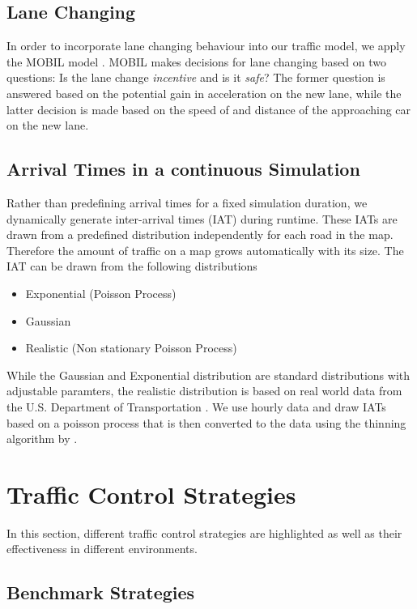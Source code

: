 \documentclass[10pt]{article}
\begin{document}
\subsection{Lane Changing}
In order to incorporate lane changing behaviour into our traffic model, we apply the MOBIL model \citep{treiber2002realistische, kesting2007general}. MOBIL makes decisions for lane changing based on two questions: Is the lane change \textit{incentive} and is it \textit{safe}? The former question is answered based on the potential gain in acceleration on the new lane, while the latter decision is made based on the speed of and distance of the approaching car on the new lane.

\subsection{Arrival Times in a continuous Simulation}
Rather than predefining arrival times for a fixed simulation duration, we dynamically generate inter-arrival times (IAT) during runtime. These IATs are drawn from a predefined distribution independently for each road in the map. Therefore the amount of traffic on a map grows automatically with its size. The IAT can be drawn from the following distributions
 
 
\begin{itemize}
	\item Exponential (Poisson Process)
	\item Gaussian
	\item Realistic (Non stationary Poisson Process)
\end{itemize}
 
 
While the Gaussian and Exponential distribution are standard distributions with adjustable paramters, the realistic distribution is based on real world data from the U.S. Department of Transportation \citep{trafficdata}. We use hourly data and draw IATs based on a poisson process that is then converted to the data using the thinning algorithm by \citet{lewis1979simulation}.

\section{Traffic Control Strategies}
\label{sec:strategies}
In this section, different traffic control strategies are highlighted as well as their effectiveness in different environments.

\subsection{Benchmark Strategies}
\end{document}
